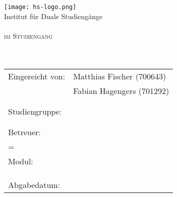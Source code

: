
\begin{titlepage}

	\begin{center}
		\texttt{[image: hs-logo.png]}\\
		\large{Institut für Duale Studiengänge}\\[4ex]
		
		\large{\scshape \betreff}\\
		\large{\scshape im Studiengang \studiengang}\\[10ex]
		
		
		\huge{\textbf{\titel}}\\[1.5ex]
		\Large{\textbf{\untertitel}}\\[10ex]
	\end{center}
	
	\begin{tabular} { p{7.5cm} l }
		Eingereicht von: & Matthias Fischer (700643) \\
		& Fabian Hagengers (701292) \\
		\\
		\\
		Studiengruppe: & \autorStudiengruppe \\
		\\\\
		Betreuer: & \betreuer \\
		\if\zweitBetreuer={}\else & \zweitBetreuer \\ \fi
		Modul: & \modul \\
		\\\\\\
		Abgabedatum: & \abgabeTermin \\
	\end{tabular}


\end{titlepage}
